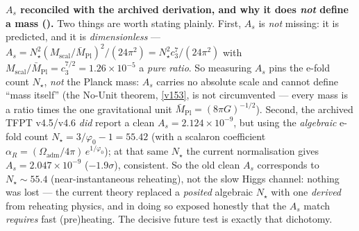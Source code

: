 \documentclass[11pt,a4paper]{article}
\newcommand{\cthree}{c_3}
\newcommand{\phiz}{\varphi_0}
\begin{document}
\smallskip\noindent\textbf{$A_s$ reconciled with the archived derivation, and why it does \emph{not} define a
mass ().} Two things are worth stating plainly. First, $A_s$ is \emph{not} missing:
it is predicted, and it is \emph{dimensionless} --- $A_s=N_\star^2(M_{\mathrm{scal}}/\bar M_{\mathrm{Pl}})^2/(24\pi^2)
=N_\star^2\cthree^7/(24\pi^2)$ with $M_{\mathrm{scal}}/\bar M_{\mathrm{Pl}}=\cthree^{7/2}=1.26\times10^{-5}$ a
\emph{pure ratio}. So measuring $A_s$ pins the e-fold count $N_\star$, \emph{not} the Planck mass: $A_s$ carries no
absolute scale and cannot define ``mass itself'' (the No-Unit theorem, \vref{v153}, is not circumvented --- every
mass is a ratio times the one gravitational unit $\bar M_{\mathrm{Pl}}=(8\pi G)^{-1/2}$). Second, the archived TFPT
v4.5/v4.6 \emph{did} report a clean $A_s=2.124\times10^{-9}$, but using the \emph{algebraic} e-fold count
$N_\star=3/\phiz-1=55.42$ (with a scalaron coefficient $\alpha_R=(\Omega_{\mathrm{adm}}/4\pi)\,e^{1/\phiz}$); at that
same $N_\star$ the current normalisation gives $A_s=2.047\times10^{-9}$ ($-1.9\sigma$), consistent. So the old clean
$A_s$ corresponds to $N_\star\!\sim\!55.4$ (near-instantaneous reheating), not the slow Higgs channel: nothing was
lost --- the current theory replaced a \emph{posited} algebraic $N_\star$ with one \emph{derived} from reheating
physics, and in doing so exposed honestly that the $A_s$ match \emph{requires} fast (pre)heating. The decisive
future test is exactly that dichotomy.
\end{document}

